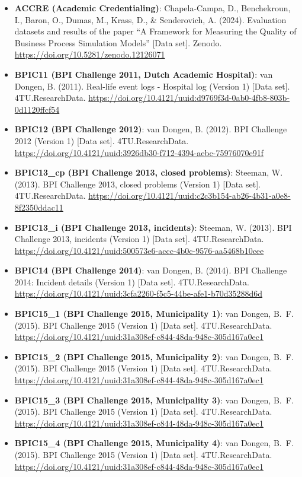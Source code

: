 \documentclass[11pt,a4paper]{article}
\begin{document}
\begin{itemize}\footnotesize\raggedright
\item \textbf{ACCRE (Academic Credentialing)}: Chapela-Campa, D., Benchekroun, I., Baron, O., Dumas, M., Krass, D., \& Senderovich, A. (2024). Evaluation datasets and results of the paper ``A Framework for Measuring the Quality of Business Process Simulation Models'' [Data set]. Zenodo. \url{https://doi.org/10.5281/zenodo.12126071}
\item \textbf{BPIC11 (BPI Challenge 2011, Dutch Academic Hospital)}: van Dongen, B. (2011). Real-life event logs - Hospital log (Version 1) [Data set]. 4TU.ResearchData. \url{https://doi.org/10.4121/uuid:d9769f3d-0ab0-4fb8-803b-0d1120ffcf54}
\item \textbf{BPIC12 (BPI Challenge 2012)}: van Dongen, B. (2012). BPI Challenge 2012 (Version 1) [Data set]. 4TU.ResearchData. \url{https://doi.org/10.4121/uuid:3926db30-f712-4394-aebc-75976070e91f}
\item \textbf{BPIC13\_cp (BPI Challenge 2013, closed problems)}: Steeman, W. (2013). BPI Challenge 2013, closed problems (Version 1) [Data set]. 4TU.ResearchData. \url{https://doi.org/10.4121/uuid:c2c3b154-ab26-4b31-a0e8-8f2350ddac11}
\item \textbf{BPIC13\_i (BPI Challenge 2013, incidents)}: Steeman, W. (2013). BPI Challenge 2013, incidents (Version 1) [Data set]. 4TU.ResearchData. \url{https://doi.org/10.4121/uuid:500573e6-accc-4b0c-9576-aa5468b10cee}
\item \textbf{BPIC14 (BPI Challenge 2014)}: van Dongen, B. (2014). BPI Challenge 2014: Incident details (Version 1) [Data set]. 4TU.ResearchData. \url{https://doi.org/10.4121/uuid:3cfa2260-f5c5-44be-afe1-b70d35288d6d}
\item \textbf{BPIC15\_1 (BPI Challenge 2015, Municipality 1)}: van Dongen, B.~F. (2015). BPI Challenge 2015 (Version 1) [Data set]. 4TU.ResearchData. \url{https://doi.org/10.4121/uuid:31a308ef-c844-48da-948c-305d167a0ec1}
\item \textbf{BPIC15\_2 (BPI Challenge 2015, Municipality 2)}: van Dongen, B.~F. (2015). BPI Challenge 2015 (Version 1) [Data set]. 4TU.ResearchData. \url{https://doi.org/10.4121/uuid:31a308ef-c844-48da-948c-305d167a0ec1}
\item \textbf{BPIC15\_3 (BPI Challenge 2015, Municipality 3)}: van Dongen, B.~F. (2015). BPI Challenge 2015 (Version 1) [Data set]. 4TU.ResearchData. \url{https://doi.org/10.4121/uuid:31a308ef-c844-48da-948c-305d167a0ec1}
\item \textbf{BPIC15\_4 (BPI Challenge 2015, Municipality 4)}: van Dongen, B.~F. (2015). BPI Challenge 2015 (Version 1) [Data set]. 4TU.ResearchData. \url{https://doi.org/10.4121/uuid:31a308ef-c844-48da-948c-305d167a0ec1}

\end{itemize}
\end{document}
